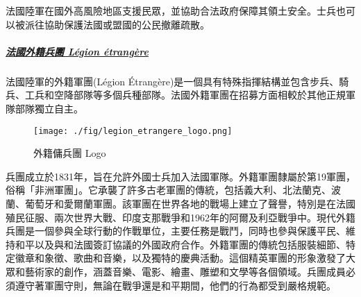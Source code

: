 \documentclass[a4paper,14pt]{extarticle}
\theoremstyle{plain}
\theoremstyle{remark}
\numberwithin{equation}{section}
\begin{document}
法國陸軍在國外高風險地區支援民眾，並協助合法政府保障其領土安全。士兵也可以被派往協助保護法國或盟國的公民撤離疏散。



%



\subparagraph{\underline{法國外籍兵團 Légion étrangère}}

法國陸軍的外籍軍團(Légion \'Etrangère)是一個具有特殊指揮結構並包含步兵、騎兵、工兵和空降部隊等多個兵種部隊。法國外籍軍團在招募方面相較於其他正規軍隊部隊獨立自主。


\begin{wrapfigure}[10]{l}{5cm}
  \texttt{[image: ./fig/legion\_etrangere\_logo.png]}
  \caption{外籍傭兵團 Logo}
\end{wrapfigure}


兵團成立於1831年，旨在允許外國士兵加入法國軍隊。外籍軍團隸屬於第19軍團，俗稱「非洲軍團」。它承襲了許多古老軍團的傳統，包括義大利、北法蘭克、波蘭、葡萄牙和愛爾蘭軍團。該軍團在世界各地的戰場上建立了聲譽，特別是在法國殖民征服、兩次世界大戰、印度支那戰爭和1962年的阿爾及利亞戰爭中。現代外籍兵團是一個參與全球行動的作戰單位，主要任務是戰鬥，同時也參與保護平民、維持和平以及與和法國簽訂協議的外國政府合作。外籍軍團的傳統包括服裝細節、特定徽章和象徵、歌曲和音樂，以及獨特的慶典活動。這個精英軍團的形象激發了大眾和藝術家的創作，涵蓋音樂、電影、繪畫、雕塑和文學等各個領域。兵團成員必須遵守著軍團守則，無論在戰爭還是和平期間，他們的行為都受到嚴格規範。
\end{document}
